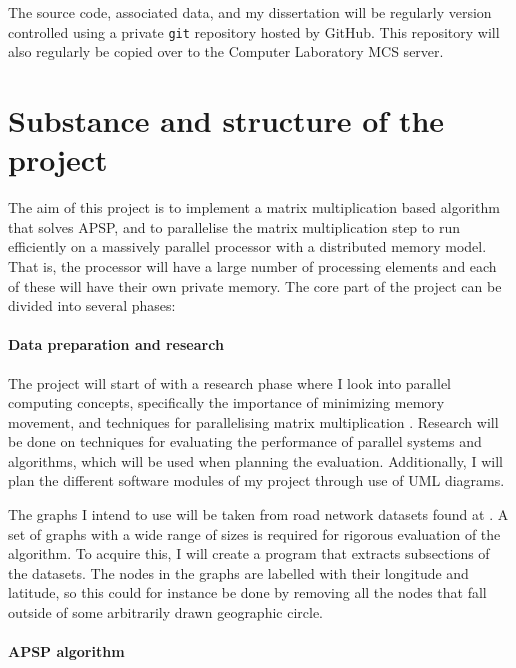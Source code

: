 \documentclass{article}
\begin{document}
The source code, associated data, and my dissertation will be regularly version controlled
using a private \texttt{git} repository hosted by GitHub. This repository will also regularly
be copied over to the Computer Laboratory MCS server.

\section*{Substance and structure of the project}%
\label{sec:Substance and Structure of the Project}

The aim of this project is to implement a matrix multiplication based algorithm that solves
APSP, and to parallelise the matrix multiplication step to run
efficiently on a massively parallel processor with a distributed memory model. That is, the processor
will have a large number of processing elements and each of these will have their own private memory.
The core part of the project can be divided into several phases:

\paragraph{Data preparation and research}%
\label{par:Preparation research}

The project will start of with a research phase where I look into parallel
computing concepts, specifically the importance of minimizing memory movement,
and techniques for parallelising matrix multiplication \cite{cannon, fox}.
Research will be done on techniques for evaluating the performance of parallel
systems and algorithms, which will be used when planning the evaluation.
Additionally, I will plan the different software modules of my project through
use of UML diagrams.

The graphs I intend to use will be taken from road network datasets found at
\cite{road-data}. A set of graphs with a wide range of sizes is required for
rigorous evaluation of the algorithm. To acquire this, I will create a program
that extracts subsections of the datasets. The nodes in the graphs are labelled
with their longitude and latitude, so this could for instance be done by
removing all the nodes that fall outside of some arbitrarily drawn geographic circle.

\paragraph{APSP algorithm}%
\label{par:APSP Algorithm}
\end{document}
